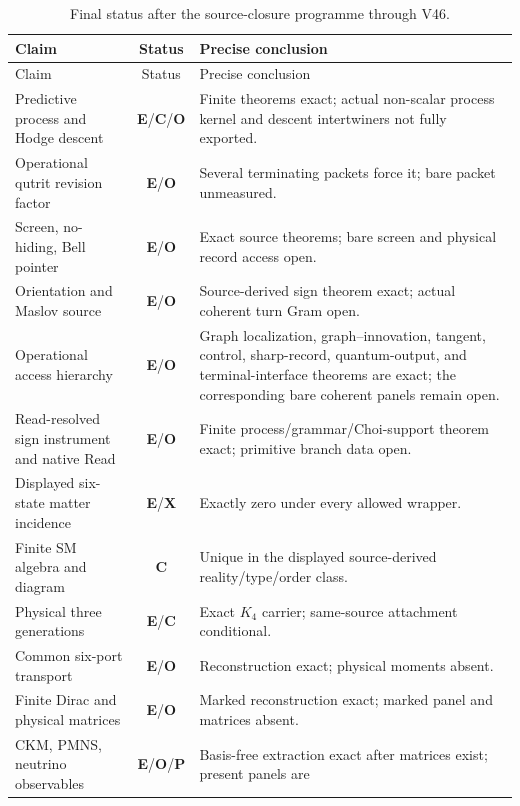 \documentclass[11pt,oneside,openany]{book}
\numberwithin{equation}{chapter}
\theoremstyle{definition}
\theoremstyle{remark}
\newcommand{\statusE}{\textcolor{ExactColor}{\textbf{E}}}
\newcommand{\statusC}{\textcolor{CondColor}{\textbf{C}}}
\newcommand{\statusP}{\textcolor{PostColor}{\textbf{P}}}
\newcommand{\statusO}{\textcolor{OpenColor}{\textbf{O}}}
\newcommand{\statusX}{\textcolor{SuperColor}{\textbf{X}}}
\begin{document}
\begin{longtable}{@{}p{}cp{}@{}}
\caption{Final status after the source-closure programme through V46.}
\label{tab:final-status-v6}\\
\toprule
Claim & Status & Precise conclusion\\
\midrule
\endfirsthead
\toprule
Claim & Status & Precise conclusion\\
\midrule
\endhead
Predictive process and Hodge descent
& \statusE/\statusC/\statusO
& Finite theorems exact; actual non-scalar process kernel and descent
intertwiners not fully exported.\\
\addlinespace
Operational qutrit revision factor
& \statusE/\statusO
& Several terminating packets force it; bare packet unmeasured.\\
\addlinespace
Screen, no-hiding, Bell pointer
& \statusE/\statusO
& Exact source theorems; bare screen and physical record access open.\\
\addlinespace
Orientation and Maslov source
& \statusE/\statusO
& Source-derived sign theorem exact; actual coherent turn Gram open.\\
\addlinespace
Operational access hierarchy
& \statusE/\statusO
& Graph localization, graph--innovation, tangent, control, sharp-record,
quantum-output, and terminal-interface theorems are exact; the corresponding
bare coherent panels remain open.\\
\addlinespace
Read-resolved sign instrument and native Read
& \statusE/\statusO
& Finite process/grammar/Choi-support theorem exact; primitive branch data open.\\
\addlinespace
Displayed six-state matter incidence
& \statusE/\statusX
& Exactly zero under every allowed wrapper.\\
\addlinespace
Finite SM algebra and diagram
& \statusC
& Unique in the displayed source-derived reality/type/order class.\\
\addlinespace
Physical three generations
& \statusE/\statusC
& Exact \(K_4\) carrier; same-source attachment conditional.\\
\addlinespace
Common six-port transport
& \statusE/\statusO
& Reconstruction exact; physical moments absent.\\
\addlinespace
Finite Dirac and physical matrices
& \statusE/\statusO
& Marked reconstruction exact; marked panel and matrices absent.\\
\addlinespace
CKM, PMNS, neutrino observables
& \statusE/\statusO/\statusP
& Basis-free extraction exact after matrices exist; present panels are

\end{longtable}
\end{document}
